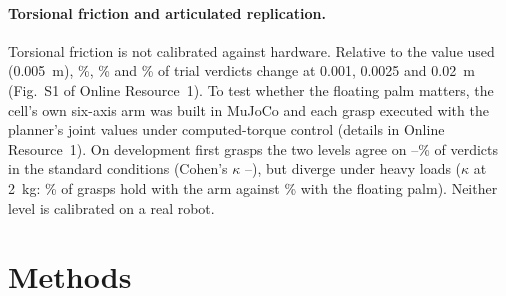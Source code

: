 \documentclass[pdflatex,sn-mathphys-num,iicol]{sn-jnl}
\begin{document}
\paragraph{Torsional friction and articulated replication.} Torsional friction is not calibrated against hardware. Relative to the value used (0.005~m), \devFlipLow\%, \devFlipMid\% and \devFlipHigh\% of trial verdicts change at 0.001, 0.0025 and 0.02~m (Fig.~S1 of Online Resource~1). To test whether the floating palm matters, the cell's own six-axis arm was built in MuJoCo and each grasp executed with the planner's joint values under computed-torque control (details in Online Resource~1). On \artGrasps{} development first grasps the two levels agree on \artAgreeMin--\artAgreeMax\% of verdicts in the standard conditions (Cohen's $\kappa$ \artKappaMin--\artKappaMax), but diverge under heavy loads ($\kappa$ \artKappaTwoKg{} at 2~kg: \artHeldTwoKgArt\% of grasps hold with the arm against \artHeldTwoKgVthree\% with the floating palm). Neither level is calibrated on a real robot.

\section{Methods}\label{sec:methods}
\end{document}

